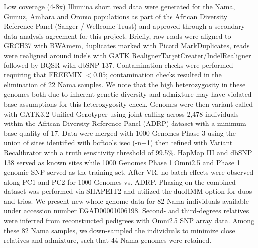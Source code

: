 \documentclass[]{article}
\begin{document}
Low coverage (4-8x) Illumina short read data were generated for the Nama,
Gumuz, Amhara and Oromo populations as part of the African Diversity Reference
Panel (Sanger / Wellcome Trust) \citep{Gurdasani2015-qy,Pagani2015-pz} and
approved through a secondary data analysis agreement for this project. Briefly,
raw reads were aligned to GRCH37 with BWAmem, duplicates
marked with Picard MarkDuplicates, reads were realigned around indels with GATK
RealignerTargetCreater/IndelRealigner followed by BQSR with dbSNP 137.
Contamination checks were performed requiring that FREEMIX $<0.05$;
contamination checks resulted in the elimination of 22 Nama samples. We note
that the high heterozygosity in these genomes both due to inherent genetic
diversity and admixture may have violated base assumptions for this
heterozygosity check. Genomes were then variant called with GATK3.2 Unified
Genotyper \citep{DePristo2011-up} using joint calling across 2,478 individuals within
the African Diversity Reference Panel (ADRP) dataset with a
minimum base quality of 17. Data were merged with 1000
Genomes Phase 3 \citep{1000_Genomes_Project_Consortium2015-zq} using the union
of sites identified with bcftools isec (-n+1) \citep{Danecek2021-kc} then refined
with Variant Recalibrator with a truth sensitivity threshold of 99.5\%. HapMap
III and dbSNP 138 served as known sites while 1000 Genomes Phase 1 Omni2.5 and
Phase 1 genomic SNP served as the training set. After VR, no batch effects were
observed along PC1 and PC2 for 1000 Genomes vs. ADRP. Phasing on the combined
dataset was performed via SHAPEIT2 \citep{Delaneau2013-aw} and utilized the duoHMM
option for duos and trios. We present new whole-genome data for 82 Nama individuals 
available under accession number EGAD00001006198.
Second- and third-degrees relatives were inferred from reconstructed
pedigrees with Omni2.5 SNP array data.
Among these 82 Nama samples, we down-sampled the individuals to minimize
close relatives and admixture, such that 44 Nama genomes were retained.
\end{document}

